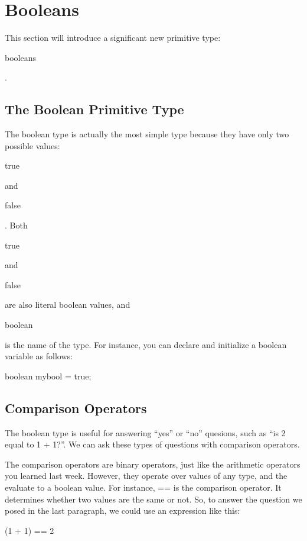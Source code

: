 \section{Booleans}

This section will introduce a significant new primitive type: \begin{textbf}booleans\end{textbf}.

\subsection{The Boolean Primitive Type}

The boolean type is actually the most simple type because they have only two possible values: \begin{textit}true\end{textit} and \begin{textit}false\end{textit}. Both \begin{textit}true\end{textit} and \begin{textit}false\end{textit} are also literal boolean values, and \begin{textit}boolean\end{textit} is the name of the type. For instance, you can declare and initialize a boolean variable as follows:

\begin{code}
boolean mybool = true;
\end{code}


\subsection{Comparison Operators}
The boolean type is useful for answering ``yes'' or ``no'' quesions, such as ``is 2 equal to 1 + 1?''. We can ask these types of questions with comparison operators. 

The comparison operators are binary operators, just like the arithmetic operators you learned last week. However, they operate over values of any type, and the evaluate to a boolean value. For instance, == is the comparison operator. It determines whether two values are the same or not. So, to answer the question we posed in the last paragraph, we could use an expression like this:

\begin{code}

(1 + 1) == 2

\end{code}

